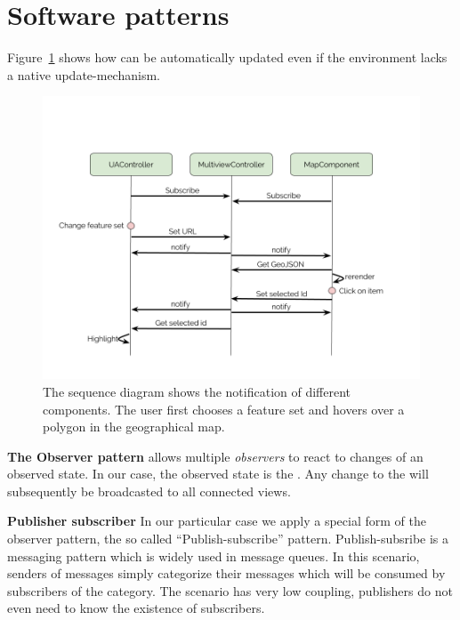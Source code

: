 \section{Software patterns}\label{sec:implementation:patterns}
Figure~\ref{fig:implementation:sequence-diagram} shows how \cmvs{} can be automatically updated even if the environment lacks a native update-mechanism.

\begin{figure}[h!]
  \centering
  \includegraphics[width=\textwidth]{images/sequence-diagram.png}
  \caption{%
    The sequence diagram shows the notification of different components.
  The user first chooses a feature set and hovers over a polygon in the geographical map.
  }\label{fig:implementation:sequence-diagram}
\end{figure}


\textbf{The Observer pattern} allows multiple \emph{observers} to react to changes of an observed state.
In our case, the observed state is the .
Any change to the  will subsequently be broadcasted to all connected views.


\textbf{Publisher subscriber}
In our particular case we apply a special form of the observer pattern, the so called ``Publish-subscribe'' pattern\cite{Eugster2003}.
Publish-subsribe is a messaging pattern which is widely used in message queues.
In this scenario, senders of messages simply categorize their messages which will be consumed by subscribers of the category.
The scenario has very low coupling, publishers do not even need to know the existence of subscribers.

